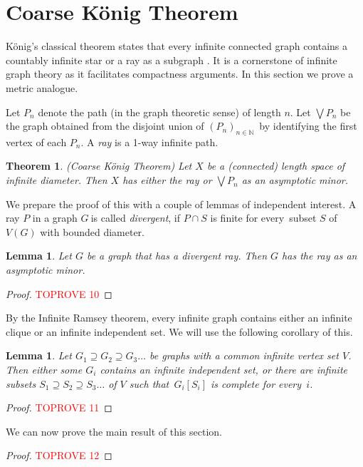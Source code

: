 \documentclass[a4paper]{article}
\newcommand{\defi}[1]{{\color{darkgray}\emph{#1}}}
\newtheorem{theorem}[proposition]{Theorem}
\newtheorem{lemma}[proposition]{Lemma}
\newcommand{\N}{\ensuremath{\mathbb N}}
\newcommand{\seq}[1]{\ensuremath{(#1_n)_{n\in\N}}}
\newcommand{\g}{\ensuremath{G\ }}
\newcommand{\fe}{for every}
\newcommand{\st}{such that}
\begin{document}
\section{Coarse K\"onig Theorem} \label{sec Konig}
K\"onig's classical theorem states that every infinite connected graph contains a countably infinite star or a ray as a subgraph \cite[Proposition 8.2.1.]{DiestelBook05}. It is a cornerstone of infinite graph theory as it facilitates compactness arguments. In this section we prove a metric analogue. 
\smallskip

Let $P_n$ denote the path (in the graph theoretic sense) of length $n$. Let $\bigvee P_n$ be the graph obtained from the disjoint union of \seq{P}\ by identifying the first vertex of each $P_n$. A \defi{ray} is a 1-way infinite path. 


\begin{theorem} \label{thm Konig}
(Coarse K\"onig Theorem) Let $X$ be a (connected) length space of infinite diameter. Then $X$ has either the ray or $\bigvee P_n$ as an asymptotic minor.
\end{theorem}

We prepare the proof of this with a couple of lemmas of independent interest. A ray $P$ in a graph \g is called \defi{divergent}, if $P\cap S$ is finite \fe\ subset $S$ of $V(G)$ with bounded diameter. 

\begin{lemma} \label{lem ray}
Let $G$ be a graph that has a divergent ray. Then $G$ has  the ray as an asymptotic minor.
\end{lemma}
\begin{proof}\textcolor{red}{TOPROVE 10}\end{proof}

By the Infinite Ramsey theorem, every infinite graph contains either an infinite clique or an infinite independent set. We will use the following corollary of this.
\begin{lemma} \label{Ramsey}
Let $G_1 \supseteq G_2 \supseteq G_3 \ldots$ be graphs with a common infinite vertex set $V$. Then either some $G_i$ contains an infinite independent set, or there are infinite subsets $S_1 \supseteq S_2 \supseteq S_3 \ldots$ of $V$ \st\ $G_i[S_i]$ is complete \fe\ $i$.
\end{lemma}
\begin{proof}\textcolor{red}{TOPROVE 11}\end{proof}

We can now prove the main result of this section.
\begin{proof}\textcolor{red}{TOPROVE 12}\end{proof}
\end{document}
